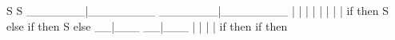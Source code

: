        S                   S
_______|________    _______|________
|    |    |    |    |    |    |    |
if  then  S   else  if  then  S   else
        __|___              __|___
        |    |              |    |
        if  then            if  then
